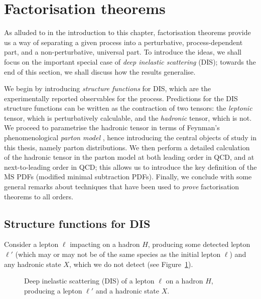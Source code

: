 \documentclass[withindex,glossary]{cam-thesis}
\begin{document}
\section{Factorisation theorems}
\label{sec:factorisation}

As alluded to in the introduction to this chapter, factorisation theorems provide us a way of separating a given process into a perturbative, process-dependent part, and a non-perturbative, universal part. To introduce the ideas, we shall focus on the important special case of \textit{deep inelastic scattering} (DIS); towards the end of this section, we shall discuss how the results generalise.

We begin by introducing \textit{structure functions} for DIS, which are the experimentally reported observables for the process. Predictions for the DIS structure functions can be written as the contraction of two tensors: the \textit{leptonic} tensor, which is perturbatively calculable, and the \textit{hadronic} tensor, which is not. We proceed to parametrise the hadronic tensor in terms of Feynman's phenomenological \textit{parton model} \cite{Feynman:1969wa}, hence introducing the central objects of study in this thesis, namely parton distributions. We then perform a detailed calculation of the hadronic tensor in the parton model at both leading order in QCD, and at next-to-leading order in QCD; this allows us to introduce the key definition of the $\overline{\text{MS}}$ PDFs (modified minimal subtraction PDFs). Finally, we conclude with some general remarks about techniques that have been used to \textit{prove} factorisation theorems to all orders. 

\subsection{Structure functions for DIS}
Consider a lepton $\ell$ impacting on a hadron $H$, producing some detected lepton $\ell'$ (which may or may not be of the same species as the initial lepton $\ell$) and any hadronic state $X$, which we do not detect (see Figure~\ref{fig:dis}). 

\begin{figure}[H]
\centering
{}
\caption{Deep inelastic scattering (DIS) of a lepton $\ell$ on a hadron $H$, producing a lepton $\ell'$ and a hadronic state $X$.}
\label{fig:dis}
\end{figure}
\end{document}
